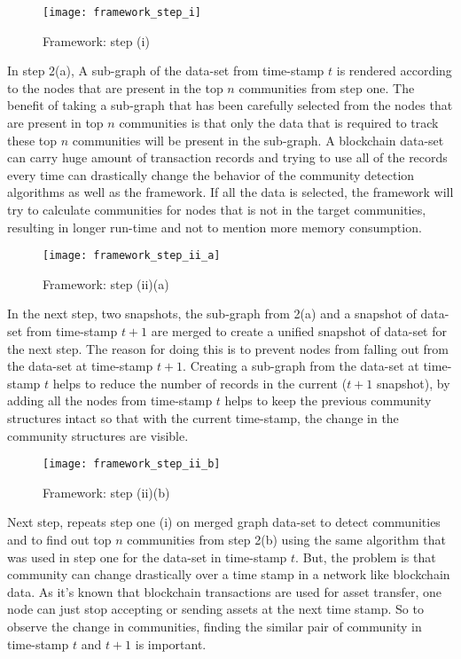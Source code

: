 \begin{figure}[H]
	\centering
	\texttt{[image: framework\_step\_i]}
	\caption{Framework: step (i)}
	\label{fig:community}
\end{figure}

In step 2(a), A sub-graph of the data-set from time-stamp $t$ is rendered according to the nodes that are present in the top $n$ communities from step one. The benefit of taking a sub-graph that has been carefully selected from the nodes that are present in top $n$ communities is that only the data that is required to track these top $n$ communities will be present in the sub-graph. A blockchain data-set can carry huge amount of transaction records and trying to use all of the records every time can drastically change the behavior of the community detection algorithms as well as the framework. If all the data is selected, the framework will try to calculate communities for nodes that is not in the target communities, resulting in longer run-time and not to mention more memory consumption.

\begin{figure}[H]
	\centering
	\texttt{[image: framework\_step\_ii\_a]}
	\caption{Framework: step (ii)(a)}
	\label{fig:community}
\end{figure}

In the next step, two snapshots, the sub-graph from 2(a) and a snapshot of data-set from time-stamp $t+1$ are merged to create a unified snapshot of data-set for the next step. The reason for doing this is to prevent nodes from falling out from the data-set at time-stamp $t+1$. Creating a sub-graph from the data-set at time-stamp $t$ helps to reduce the number of records in the current ($t+1$ snapshot), by  adding all the nodes from time-stamp $t$ helps to keep the previous community structures intact so that with the current time-stamp, the change in the community structures are visible.

\begin{figure}[H]
	\centering
	\texttt{[image: framework\_step\_ii\_b]}
	\caption{Framework: step (ii)(b)}
	\label{fig:community}
\end{figure}

Next step, repeats step one (i) on merged graph data-set to detect communities and to find out top $n$ communities from step 2(b) using the same algorithm that was used in step one for the data-set in time-stamp $t$. But, the problem is that community can change drastically over a time stamp in a network like blockchain data. As it's known that blockchain transactions are used for asset transfer, one node can just stop accepting or sending assets at the next time stamp. So to observe the change in communities, finding the similar pair of community in time-stamp $t$ and $t+1$ is important.

